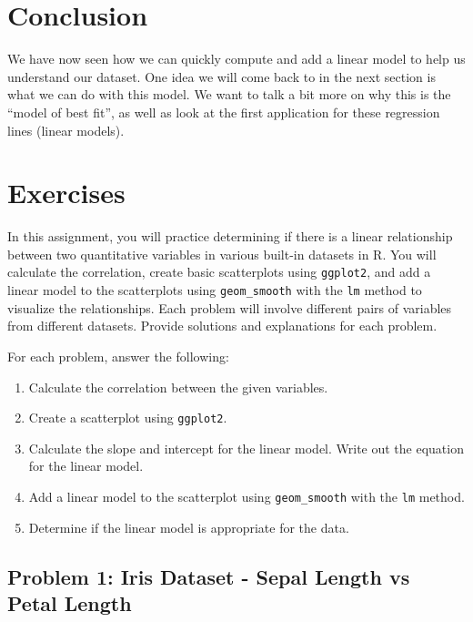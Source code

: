 \documentclass[
  letterpaper,
  DIV=11,
  numbers=noendperiod]{scrreprt}
\providecommand{\tightlist}{%
  \setlength{\itemsep}{0pt}\setlength{\parskip}{0pt}}\usepackage{longtable,booktabs,array}
\begin{document}
\section*{Conclusion}\label{conclusion-6}


We have now seen how we can quickly compute and add a linear model to
help us understand our dataset. One idea we will come back to in the
next section is what we can do with this model. We want to talk a bit
more on why this is the ``model of best fit'', as well as look at the
first application for these regression lines (linear models).

\section*{Exercises}\label{exercises-14}


In this assignment, you will practice determining if there is a linear
relationship between two quantitative variables in various built-in
datasets in R. You will calculate the correlation, create basic
scatterplots using \texttt{ggplot2}, and add a linear model to the
scatterplots using \texttt{geom\_smooth} with the \texttt{lm} method to
visualize the relationships. Each problem will involve different pairs
of variables from different datasets. Provide solutions and explanations
for each problem.

For each problem, answer the following:

\begin{enumerate}
\def\labelenumi{\arabic{enumi}.}
\tightlist
\item
  Calculate the correlation between the given variables.
\item
  Create a scatterplot using \texttt{ggplot2}.
\item
  Calculate the slope and intercept for the linear model. Write out the
  equation for the linear model.
\item
  Add a linear model to the scatterplot using \texttt{geom\_smooth} with
  the \texttt{lm} method.
\item
  Determine if the linear model is appropriate for the data.
\end{enumerate}

\subsection*{Problem 1: Iris Dataset - Sepal Length vs Petal
Length}\label{problem-1-iris-dataset---sepal-length-vs-petal-length-1}
\end{document}
